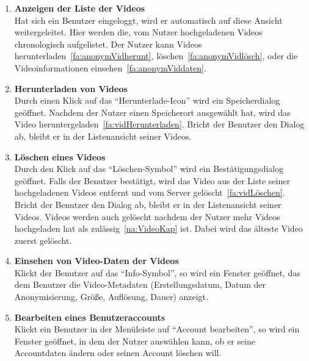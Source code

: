 \begin{enumerate}
\item \label{fa:anonymVidAnzeigen}\textbf{Anzeigen der Liste der  Videos} \hfill \\
Hat sich ein Benutzer eingeloggt, wird er automatisch auf diese Ansicht weitergeleitet. Hier werden die, vom Nutzer hochgeladenen Videos chronologisch aufgelistet. Der Nutzer kann Videos herunterladen~\eqref{fa:anonymVidherunt}, löschen~\eqref{fa:anonymVidlösch},  oder die Videoinformationen einsehen~\eqref{fa:anonymViddaten}.

\item \label{fa:anonymVidherunt}\textbf{Herunterladen von  Videos} \hfill \\
Durch einen Klick auf das ``Herunterlade-Icon'' wird ein Speicherdialog geöffnet. Nachdem der Nutzer einen Speicherort ausgewählt hat, wird das Video heruntergeladen~\eqref{fa:vidHerunterladen}. Bricht der Benutzer den Dialog ab, bleibt er in der Listenansicht seiner Videos.

\item \label{fa:anonymVidlösch}\textbf{Löschen eines  Videos} \hfill \\
Durch den Klick auf das ``Löschen-Symbol'' wird ein Bestätigungsdialog geöffnet. Falls der Benutzer bestätigt, wird das Video aus der Liste seiner hochgeladenen Videos entfernt und vom Server gelöscht~\eqref{fa:vidLöschen}. Bricht der Benutzer den Dialog ab, bleibt er in der Listenansicht seiner Videos. Videos werden auch gelöscht nachdem der Nutzer mehr Videos hochgeladen hat als zulässig~\eqref{na:VideoKap} ist. Dabei wird das älteste Video zuerst gelöscht.

\item \label{fa:anonymViddaten}\textbf{Einsehen von Video-Daten der  Videos} \hfill \\
Klickt der Benutzer auf das ``Info-Symbol'', so wird ein Fenster geöffnet, das dem Benutzer die Video-\gls{Metadaten} (Erstellungsdatum, Datum der Anonymisierung, Größe, Auflösung, Dauer) anzeigt.

\item \label{fa:accBearb}\textbf{Bearbeiten eines Benutzeraccounts} \hfill \\
Klickt ein Benutzer in der Menüleiste auf ``Account bearbeiten'', so wird ein Fenster geöffnet, in dem der Nutzer auswählen kann, ob er seine Accountdaten ändern oder seinen Account löschen will.


\end{enumerate}
